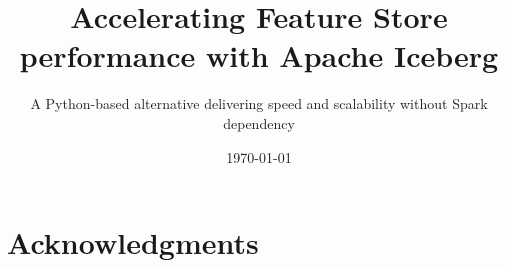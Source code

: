 \documentclass[nomenclature, english, bibtex]{kththesis}
\date{\today}
\title{Accelerating Feature Store performance with Apache Iceberg}
\subtitle{A Python-based alternative delivering speed and scalability without Spark dependency}
\begin{document}

\kthcover
\clearpage\thispagestyle{empty}\mbox{} %
\titlepage

\bookinfopage

\frontmatter
\setcounter{page}{1}

\begin{abstract}
    
\end{abstract}

\cleardoublepage

\begin{abstract}
   
\end{abstract}

\cleardoublepage

\begin{abstract}
    
\end{abstract}

\cleardoublepage

\section*{Acknowledgments}
    
\end{document}
